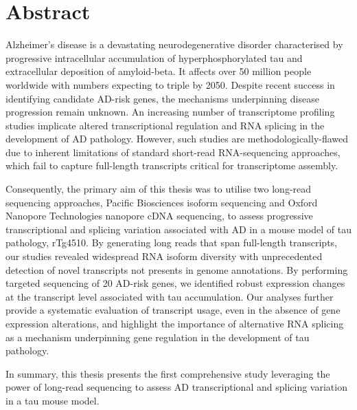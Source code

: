 \chapter*{Abstract}

Alzheimer's disease is a devastating neurodegenerative disorder characterised by progressive intracellular accumulation of hyperphosphorylated tau and extracellular deposition of amyloid-beta. It affects over 50 million people worldwide with numbers expecting to triple by 2050. Despite recent success in identifying candidate AD-risk genes, the mechanisms underpinning disease progression remain unknown. An increasing number of transcriptome profiling studies implicate altered transcriptional regulation and RNA splicing in the development of AD pathology. However, such studies are methodologically-flawed due to inherent limitations of standard short-read RNA-sequencing approaches, which fail to capture full-length transcripts critical for transcriptome assembly.  

Consequently, the primary aim of this thesis was to utilise two long-read sequencing approaches, Pacific Biosciences isoform sequencing and Oxford Nanopore Technologies nanopore cDNA sequencing, to assess progressive transcriptional and splicing variation associated with AD in a mouse model of tau pathology, rTg4510. By generating long reads that span full-length transcripts, our studies revealed widespread RNA isoform diversity with unprecedented detection of novel transcripts not presents in genome annotations. By performing targeted sequencing of 20 AD-risk genes, we identified robust expression changes at the transcript level associated with tau accumulation. Our analyses further provide a systematic evaluation of transcript usage, even in the absence of gene expression alterations, and highlight the importance of alternative RNA splicing as a mechanism underpinning gene regulation in the development of tau pathology. 

In summary, this thesis presents the first comprehensive study leveraging the power of long-read sequencing to assess AD transcriptional and splicing variation in a tau mouse model.       